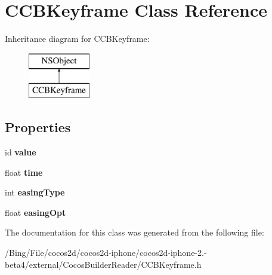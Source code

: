 \hypertarget{interface_c_c_b_keyframe}{\section{C\-C\-B\-Keyframe Class Reference}
\label{interface_c_c_b_keyframe}
}
Inheritance diagram for C\-C\-B\-Keyframe\-:\begin{figure}[H]
\begin{center}
\leavevmode
\includegraphics[height=2.000000cm]{interface_c_c_b_keyframe}
\end{center}
\end{figure}
\subsection*{Properties}
\begin{DoxyCompactItemize}
\item 
\hypertarget{interface_c_c_b_keyframe_a3159a26933c49219fa54bd9483da23f0}{id {\bfseries value}}\label{interface_c_c_b_keyframe_a3159a26933c49219fa54bd9483da23f0}

\item 
\hypertarget{interface_c_c_b_keyframe_adb9521fe1fbaca4d8dd9f207cbfabee0}{float {\bfseries time}}\label{interface_c_c_b_keyframe_adb9521fe1fbaca4d8dd9f207cbfabee0}

\item 
\hypertarget{interface_c_c_b_keyframe_a53a7f3fa629e2162d758d0b88a115e93}{int {\bfseries easing\-Type}}\label{interface_c_c_b_keyframe_a53a7f3fa629e2162d758d0b88a115e93}

\item 
\hypertarget{interface_c_c_b_keyframe_a151bfc46187dbbe4dda5b22738a50c64}{float {\bfseries easing\-Opt}}\label{interface_c_c_b_keyframe_a151bfc46187dbbe4dda5b22738a50c64}

\end{DoxyCompactItemize}


The documentation for this class was generated from the following file\-:\begin{DoxyCompactItemize}
\item 
/\-Bing/\-File/cocos2d/cocos2d-\/iphone/cocos2d-\/iphone-\/2.-\/beta4/external/\-Cocos\-Builder\-Reader/C\-C\-B\-Keyframe.\-h\end{DoxyCompactItemize}
